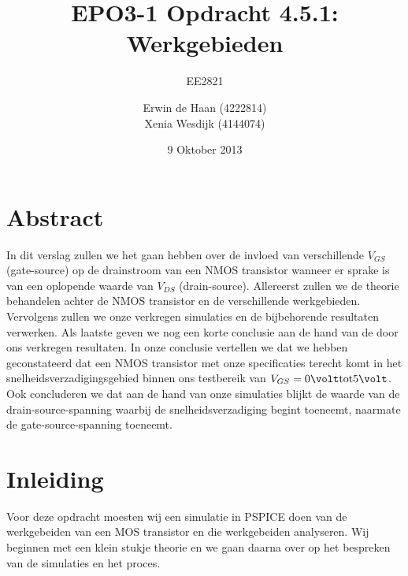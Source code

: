 \documentclass{scrartcl}  %
\author{Erwin {de Haan} (4222814)  \\{Xenia Wesdijk} (4144074)}
\title{EPO3-1   Opdracht 4.5.1: Werkgebieden}
\subtitle{EE2821}
\date{9 Oktober 2013}
\begin{document}
\maketitle
\vspace{80 mm}
\section*{Abstract}
In dit verslag zullen we het gaan hebben over de invloed van verschillende $V_{GS}$ (gate-source) op de drainstroom van een NMOS transistor wanneer er sprake is van een oplopende waarde van $V_{DS}$ (drain-source). 
Allereerst zullen we de theorie behandelen achter de NMOS transistor en de verschillende werkgebieden. 
Vervolgens zullen we onze verkregen simulaties en de bijbehorende resultaten verwerken. 
Als laatste geven we nog een korte conclusie aan de hand van de door ons verkregen resultaten. 
In onze conclusie vertellen we dat we hebben geconstateerd dat een NMOS transistor met onze specificaties terecht komt in het snelheidsverzadigingsgebied binnen ons testbereik van $V_{GS} = 0\volt \textrm{tot} 5\volt$. 
Ook concluderen we dat aan de hand van onze simulaties blijkt de waarde van de drain-source-spanning waarbij de snelheidsverzadiging begint toeneemt, naarmate de gate-source-spanning toeneemt.
\newpage
\setlength{\cftbeforetoctitleskip}{-3em}
\tableofcontents
\newpage
{}
\section{Inleiding}
Voor deze opdracht moesten wij een simulatie in PSPICE doen van de werkgebeiden van een MOS transistor en die werkgebeiden analyseren.
Wij beginnen met een klein stukje theorie en we gaan daarna over op het bespreken van de simulaties en het proces.
\end{document}
